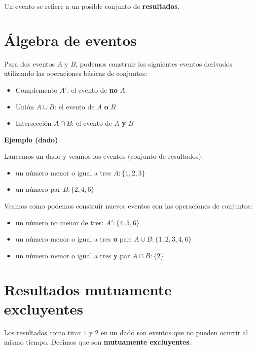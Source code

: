 \documentclass[
]{book}
\providecommand{\tightlist}{%
  \setlength{\itemsep}{0pt}\setlength{\parskip}{0pt}}
\begin{document}
Un evento se refiere a un posible conjunto de \textbf{resultados}.

\hypertarget{uxe1lgebra-de-eventos}{%
\section{Álgebra de eventos}\label{uxe1lgebra-de-eventos}}

Para dos eventos \(A\) y \(B\), podemos construir los siguientes eventos derivados utilizando las operaciones básicas de conjuntos:

\begin{itemize}
\tightlist
\item
  Complemento \(A'\): el evento de \textbf{no} \(A\)
\item
  Unión \(A \cup B\): el evento de \(A\) \textbf{o} \(B\)
\item
  Intersección \(A \cap B\): el evento de \(A\) \textbf{y} \(B\)
\end{itemize}

\textbf{Ejemplo (dado)}

Lancemos un dado y veamos los eventos (conjunto de resultados):

\begin{itemize}
\tightlist
\item
  un número menor o igual a tres \(A:\{1,2,3\}\)
\item
  un número par \(B:\{2,4,6\}\)
\end{itemize}

Veamos como podemos construir nuevos eventos con las operaciones de conjuntos:

\begin{itemize}
\tightlist
\item
  un número no menor de tres: \(A':\{4,5,6\}\)
\item
  un número menor o igual a tres \textbf{o} par: \(A \cup B: \{1,2,3,4,6\}\)
\item
  un número menor o igual a tres \textbf{y} par \(A \cap B: \{2\}\)
\end{itemize}

\hypertarget{resultados-mutuamente-excluyentes}{%
\section{Resultados mutuamente excluyentes}\label{resultados-mutuamente-excluyentes}}

Los resultados como tirar \(1\) y \(2\) en un dado son eventos que no pueden ocurrir al mismo tiempo. Decimos que son \textbf{mutuamente excluyentes}.
\end{document}
